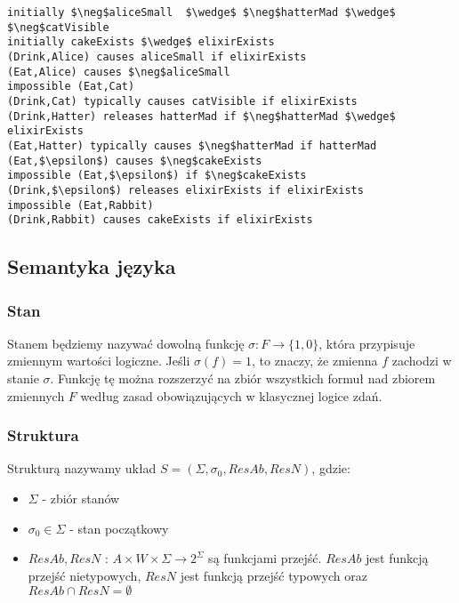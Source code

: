\documentclass{article}
\begin{document}
\bigskip
{}
\begin{lstlisting}[mathescape=true, breaklines=true]
initially $\neg$aliceSmall  $\wedge$ $\neg$hatterMad $\wedge$ $\neg$catVisible
initially cakeExists $\wedge$ elixirExists
(Drink,Alice) causes aliceSmall if elixirExists
(Eat,Alice) causes $\neg$aliceSmall
impossible (Eat,Cat)
(Drink,Cat) typically causes catVisible if elixirExists
(Drink,Hatter) releases hatterMad if $\neg$hatterMad $\wedge$ elixirExists
(Eat,Hatter) typically causes $\neg$hatterMad if hatterMad
(Eat,$\epsilon$) causes $\neg$cakeExists
impossible (Eat,$\epsilon$) if $\neg$cakeExists
(Drink,$\epsilon$) releases elixirExists if elixirExists
impossible (Eat,Rabbit)
(Drink,Rabbit) causes cakeExists if elixirExists
\end{lstlisting}

\subsection{Semantyka języka} 

\subsubsection{Stan}
Stanem będziemy nazywać dowolną funkcję $\sigma:F\to \{1,0\}$, która przypisuje zmiennym wartości logiczne. Jeśli $\sigma(f)=1$, to znaczy, że zmienna $f$ zachodzi w stanie $\sigma$. Funkcję tę można rozszerzyć na zbiór wszystkich formuł nad zbiorem zmiennych $F$ według zasad obowiązujących w klasycznej logice zdań.

\subsubsection{Struktura}
Strukturą nazywamy układ $S=(\Sigma, \sigma_{0}, ResAb, ResN)$, gdzie:
\begin{itemize}
\item $\Sigma$ - zbiór stanów
\item $\sigma_{0} \in \Sigma$ - stan początkowy
\item $ResAb, ResN$ : $A\times W \times \Sigma \to 2^{\Sigma}$ są funkcjami przejść. $ResAb$ jest funkcją przejść nietypowych, $ResN$ jest funkcją przejść typowych oraz $ResAb \cap ResN= \emptyset$ 
\end{itemize}
\end{document}
